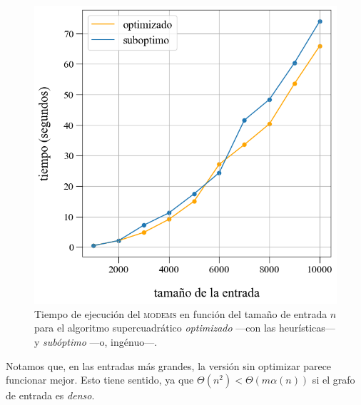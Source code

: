 \begin{figure}[!htbp]
    \includegraphics[scale=0.4, clip]{./files/src/.media/comparacion_DSU.png}
    \caption{Tiempo de ejecución del \textsc{modems} en función del tamaño de entrada $n$ para el algoritmo supercuadrático \textit{optimizado} ---con las heurísticas--- y \textit{subóptimo} ---o, ingénuo---.}\label{fig2}
\end{figure}

Notamos que, en las entradas más grandes, la versión sin optimizar parece funcionar mejor. Esto tiene sentido, ya que $\Theta(n^2) < \Theta(m\alpha(n))$ si el grafo de entrada es \textit{denso}. 
